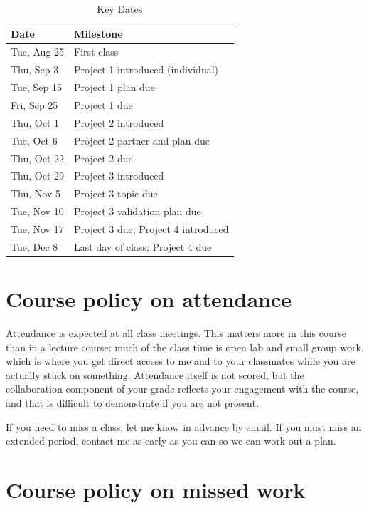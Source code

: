 \documentclass[12pt]{article}
\begin{document}
\begin{table}[htbp]
  \caption{Key Dates}
\begin{center}
  \begin{tabular}{ll}
    \toprule
    Date & Milestone \\
    \midrule
    Tue, Aug 25 & First class \\
    Thu, Sep 3  & Project 1 introduced (individual) \\
    Tue, Sep 15 & Project 1 plan due \\
    Fri, Sep 25 & Project 1 due \\
    Thu, Oct 1  & Project 2 introduced \\
    Tue, Oct 6  & Project 2 partner and plan due \\
    Thu, Oct 22 & Project 2 due \\
    Thu, Oct 29 & Project 3 introduced \\
    Thu, Nov 5  & Project 3 topic due \\
    Tue, Nov 10 & Project 3 validation plan due \\
    Tue, Nov 17 & Project 3 due; Project 4 introduced \\
    Tue, Dec 8  & Last day of class; Project 4 due \\
    \bottomrule
  \end{tabular}
\end{center}
\end{table}

\section*{Course policy on attendance}

Attendance is expected at all class meetings. This matters more in this course than in a lecture course: much of the class time is open lab and small group work, which is where you get direct access to me and to your classmates while you are actually stuck on something. Attendance itself is not scored, but the collaboration component of your grade reflects your engagement with the course, and that is difficult to demonstrate if you are not present.

If you need to miss a class, let me know in advance by email. If you must miss an extended period, contact me as early as you can so we can work out a plan.

\section*{Course policy on missed work}
\end{document}
